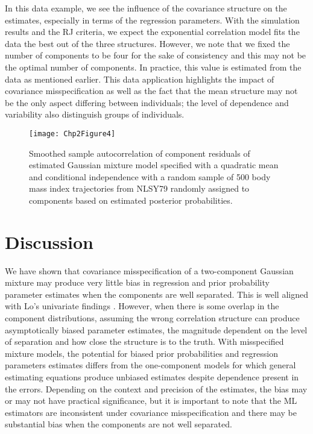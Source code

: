  In this data example, we see the influence of the covariance structure on the estimates, especially in terms of the regression parameters. With the simulation results and the RJ criteria, we expect the exponential correlation model fits the data the best out of the three structures. However, we note that we fixed the number of components to be four for the sake of consistency and this may not be the optimal number of components. In practice, this value is estimated from the data as mentioned earlier. This data application highlights the impact of covariance misspecification as well as the fact that the mean structure may not be the only aspect differing between individuals; the level of dependence and variability also distinguish groups of individuals. 
\begin{figure}
\begin{center}
\texttt{[image: Chp2Figure4]}
\end{center}
\caption{Smoothed sample autocorrelation of component residuals of estimated Gaussian mixture model specified with a quadratic mean and conditional independence with a random sample of 500 body mass index trajectories from NLSY79 randomly assigned to components based on estimated posterior probabilities. }
\label{fig:2-4}
\end{figure}
\section{Discussion}\label{chp2:disc}
We have shown that covariance misspecification of a two-component Gaussian mixture may produce very little bias in regression and prior probability parameter estimates when the components are well separated. This is well aligned with Lo's univariate findings \cite{lo2011}. However, when there is some overlap in the component distributions, assuming the wrong correlation structure can produce asymptotically biased parameter estimates, the magnitude dependent on the level of separation and how close the structure is to the truth. With misspecified mixture models, the potential for biased prior probabilities and regression parameters estimates differs from the one-component models for which general estimating equations \cite{liang1986} produce unbiased estimates despite dependence present in the errors. Depending on the context and precision of the estimates, the bias may or may not have practical significance, but it is important to note that the ML estimators are inconsistent under covariance misspecification and there may be substantial bias when the components are not well separated.

